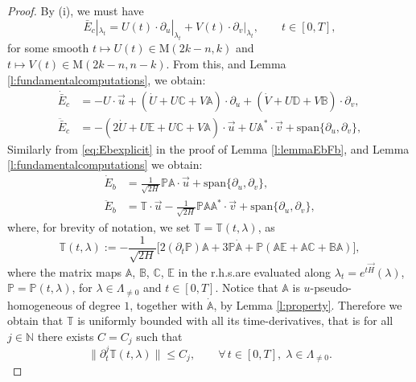 \documentclass[10pt,a4paper]{amsart}
\newcommand{\A}{\mathbb{A}}
\newcommand{\B}{\mathbb{B}}
\newcommand{\C}{\mathbb{C}}
\newcommand{\D}{\mathbb{D}}
\newcommand{\E}{\mathbb{E}}
\newcommand{\N}{\mathbb{N}} %
\renewcommand{\P}{\mathbb{P}}
\begin{document}
\begin{proof}
By (i), we must have
\begin{equation}\label{eq:ansatzEc}
\bar{E}_c|_{\lambda_t}= U(t)\cdot\partial_u|_{\lambda_t} + V(t)\cdot \partial_v|_{\lambda_t}, \qquad t\in [0,T],
\end{equation}
for some smooth $t\mapsto U(t) \in \mathrm{M}(2k-n,k)$ and $t\mapsto V(t)\in \mathrm{M}(2k-n,n-k)$. From this, and Lemma \ref{l:fundamentalcomputations}, we obtain:
\begin{align}
\dot{\bar{E}}_c &  = -U\cdot \vec{u}+(\dot{U} + U\C + V\A)\cdot \partial_u + (\dot{V} + U\D + V\B)\cdot\partial_v, \\
\ddot{\bar{E}}_c & =  -(2\dot{U} + U\E +  U\C + V\A)\cdot \vec{u} +U\A^* \cdot \vec{v} + \mathrm{span}\{\partial_u,\partial_v\}, 
\end{align}
Similarly from \eqref{eq:Ebexplicit} in the proof of Lemma \ref{l:lemmaEbFb}, and Lemma \ref{l:fundamentalcomputations} we obtain:
\begin{align}
\dot{E}_b & = \frac{1}{\sqrt{2H}}\P\A \cdot \vec{u} + \mathrm{span}\{\partial_u,\partial_v\},\\
\ddot{E}_b & = \mathbb{T}\cdot\vec{u} - \frac{1}{\sqrt{2H}} \P\A\A^* \cdot\vec{v} + \mathrm{span}\{\partial_u,\partial_v\},
\end{align}
where, for brevity of notation, we set $\mathbb{T} = \mathbb{T}(t,\lambda)$, as
\begin{equation}\label{eq:defT}
\mathbb{T}(t,\lambda):= - \frac{1}{\sqrt{2H}}\Big[2(\partial_t\P)\A + 3\P\dot{\A}+\P(\A\E+\A\C+\B\A) \Big],
\end{equation}
where the matrix maps $\A$, $\B$, $\C$, $\E$ in the r.h.s.\@ are evaluated along $\lambda_t = e^{t\vec{H}}(\lambda)$, $\P = \P(t,\lambda)$, for $\lambda \in \Lambda_{\neq 0}$ and $t\in [0,T]$. Notice that $\A$ is $u$-pseudo-homogeneous of degree $1$, together with $\dot{\A}$, by Lemma \ref{l:property}. Therefore we obtain that $\mathbb{T}$ is uniformly bounded with all its time-derivatives, that is for all $j\in \N$ there exists $C = C_j$ such that
\begin{equation}
\|\partial_t^{j}\mathbb{T}(t,\lambda)\|\leq C_j,\qquad \forall\, t\in [0,T],\; \lambda \in \Lambda_{\neq 0}.
\end{equation}


\end{proof}
\end{document}
